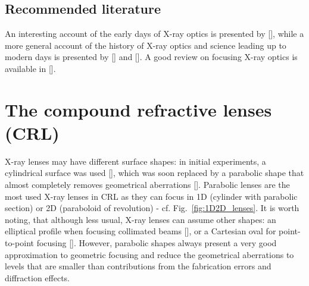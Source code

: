 \begin{refsection}
\subsection*{Recommended literature}

An interesting account of the early days of X-ray optics is presented by [\cite{Compton1928, Compton1931}], while a more general account of the history of X-ray optics and science leading up to modern days is presented by [\cite[\textit{§1}]{Willmott2019}] and [\cite[\textit{§2}]{Jacobsen2019}]. A good review on focusing X-ray optics is available in [\cite{Ice2011,Macrander2017}].

\section{The compound refractive lenses (CRL)}\label{sec:CRL}

X-ray lenses may have different surface shapes: in initial experiments, a cylindrical surface was used [\cite{Snigirev1996, Protopopov1998}], which was soon replaced by a parabolic shape that almost completely removes geometrical aberrations [\cite{Elleaume1998, Lengeler1999}]. Parabolic lenses are the most used X-ray lenses in CRL as they can focus in 1D (cylinder with parabolic section) or 2D (paraboloid of revolution) - cf. Fig.~\ref{fig:1D2D_lenses}. It is worth noting, that although less usual, X-ray lenses can assume other shapes: an elliptical profile when focusing collimated beams [\cite{Evans-Lutterodt2003}], or a Cartesian oval for point-to-point focusing [\cite{SanchezdelRio2012}]. However, parabolic shapes always present a very good approximation to geometric focusing and reduce the geometrical aberrations to levels that are smaller than contributions from the fabrication errors and diffraction effects.
\clearpage

\end{refsection}
